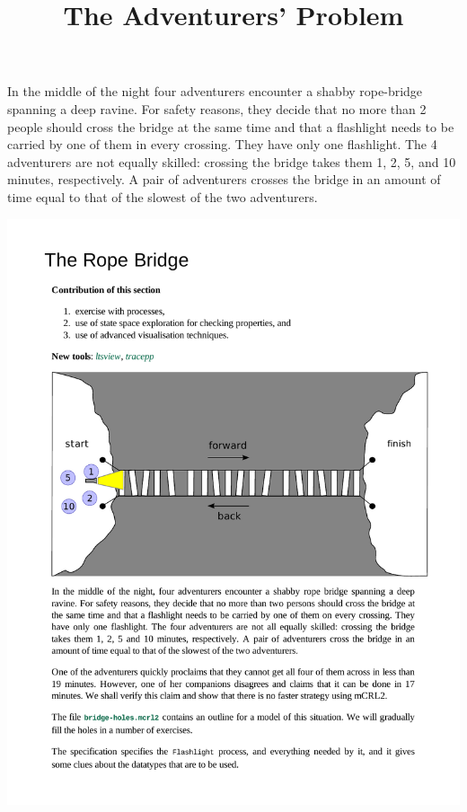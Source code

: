 \documentclass[11pt]{article}
\date{}
\theoremstyle{myplain}
\theoremstyle{definition} %
\begin{document}
 
 
\title{The Adventurers' Problem}
 
\maketitle

\noindent
In the middle of the night four adventurers encounter a shabby
rope-bridge spanning a deep ravine. For safety reasons, they decide
that no more than 2 people should cross the bridge at the same time
and that a flashlight needs to be carried by one of them in every
crossing.  They have only one flashlight. The 4 adventurers are not
equally skilled: crossing the bridge takes them 1, 2, 5, and 10
minutes, respectively. A pair of adventurers crosses the bridge in an
amount of time equal to that of the slowest of the two adventurers.
\begin{center}
\includegraphics[scale=0.8]{images/ropebridge-diag}
\end{center}
\end{document}

